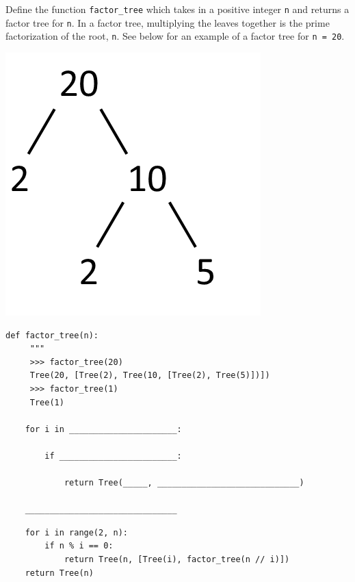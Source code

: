 \begin{blocksection}
\question Define the function \texttt{factor\_tree} which takes in a positive integer \texttt{n} and returns a factor tree for \texttt{n}. In a factor tree, multiplying the leaves together is the prime factorization of the root, \texttt{n}. See below for an example of a factor tree for \texttt{n = 20}.
\begin{center}
\includegraphics[scale=0.3]{factor_tree_20.png}
\end{center}

\vspace{2\baselineskip}
\begin{lstlisting}
def factor_tree(n):
     """
     >>> factor_tree(20)
     Tree(20, [Tree(2), Tree(10, [Tree(2), Tree(5)])])
     >>> factor_tree(1)
     Tree(1)

    for i in ______________________:

        if ________________________:

            return Tree(_____, _____________________________)

    _______________________________
\end{lstlisting}

\begin{solution}[0.5in]
\begin{lstlisting}
    for i in range(2, n):
        if n % i == 0:
            return Tree(n, [Tree(i), factor_tree(n // i)])
    return Tree(n)
\end{lstlisting}
\end{solution}

\end{blocksection}
